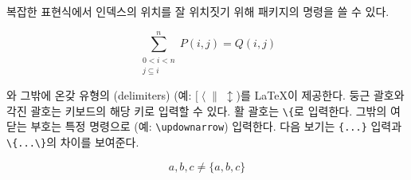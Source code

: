 복잡한 표현식에서 인덱스의 위치를 잘 위치짓기 위해  패키지의  명령을 쓸 수 있다.
\begin{example}
\begin{equation*}
\sum^n_{\substack{0<i<n \\ 
        j\subseteq i}}
   P(i,j) = Q(i,j)
\end{equation*}
\end{example}



와 그밖에 온갖 유형의 (delimiters) (예: $[\;\langle\;\|\;\updownarrow$)를 \LaTeX 이 제공한다.
둥근 괄호와 각진 괄호는 키보드의 해당 키로 입력할 수 있다. 활 괄호는 \verb|\{|로 입력한다.
그밖의 여닫는 부호는 특정 명령으로 (예: \verb|\updownarrow|) 입력한다. 다음 보기는 \verb|{...}| 입력과 \verb|\{...\}|의
차이를 보여준다.
\begin{example}
\begin{equation*}
{a,b,c} \neq \{a,b,c\}
\end{equation*}
\end{example}

